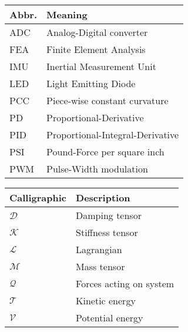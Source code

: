 \begin{spacing}{0.9}
\begin{multicols}{2}
\begin{table}[H]
\centering
    \begin{tabular}{p{1.5cm} p{5cm}} \hline
    \textbf{Abbr.}    &   \textbf{Meaning }\\ \hline
    ADC     &  Analog-Digital converter\\
    FEA     &  Finite Element Analysis \\
    IMU    & Inertial Measurement Unit \\
    LED   & Light Emitting Diode \\
    PCC   & Piece-wise constant curvature \\
    PD    & Proportional-Derivative \\
    PID    & Proportional-Integral-Derivative \\
    PSI    & Pound-Force per square inch\\
    PWM    & Pulse-Width modulation\\  \hline
    \end{tabular}
\end{table}



\begin{table}[H]
\centering
    \begin{tabular}{p{2.5cm} p{4cm}} \hline
    \textbf{Calligraphic}    &   \textbf{Description }\\ \hline

    $\mathcal{D}$     &  Damping tensor \\
    $\mathcal{K}$     &  Stiffness tensor \\
    $\mathcal{L}$     &  Lagrangian \\
    $\mathcal{M}$     &  Mass tensor \\
    $\mathcal{Q}$     &  Forces acting on system \\
    $\mathcal{T}$     &  Kinetic energy \\
    $\mathcal{V}$     &  Potential energy \\ \hline

    
    \end{tabular}
\end{table}



\end{multicols}
\end{spacing}
